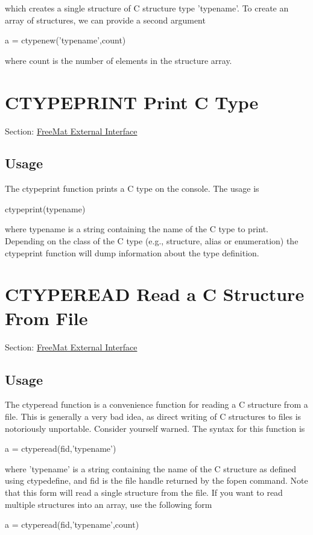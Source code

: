 which creates a single structure of C structure type {\ttfamily 'typename'}. To create an array of structures, we can provide a second argument \begin{DoxyVerb}   a = ctypenew('typename',count)
\end{DoxyVerb}
 where {\ttfamily count} is the number of elements in the structure array. \hypertarget{external_ctypeprint}{}\section{C\-T\-Y\-P\-E\-P\-R\-I\-N\-T Print C Type}\label{external_ctypeprint}
Section\-: \hyperlink{sec_external}{Free\-Mat External Interface} \hypertarget{vtkwidgets_vtkxyplotwidget_Usage}{}\subsection{Usage}\label{vtkwidgets_vtkxyplotwidget_Usage}
The {\ttfamily ctypeprint} function prints a C type on the console. The usage is \begin{DoxyVerb}  ctypeprint(typename)
\end{DoxyVerb}
 where {\ttfamily typename} is a string containing the name of the C type to print. Depending on the class of the C type (e.\-g., structure, alias or enumeration) the {\ttfamily ctypeprint} function will dump information about the type definition. \hypertarget{external_ctyperead}{}\section{C\-T\-Y\-P\-E\-R\-E\-A\-D Read a C Structure From File}\label{external_ctyperead}
Section\-: \hyperlink{sec_external}{Free\-Mat External Interface} \hypertarget{vtkwidgets_vtkxyplotwidget_Usage}{}\subsection{Usage}\label{vtkwidgets_vtkxyplotwidget_Usage}
The {\ttfamily ctyperead} function is a convenience function for reading a C structure from a file. This is generally a very bad idea, as direct writing of C structures to files is notoriously unportable. Consider yourself warned. The syntax for this function is \begin{DoxyVerb}   a = ctyperead(fid,'typename')
\end{DoxyVerb}
 where {\ttfamily 'typename'} is a string containing the name of the C structure as defined using {\ttfamily ctypedefine}, and {\ttfamily fid} is the file handle returned by the {\ttfamily fopen} command. Note that this form will read a single structure from the file. If you want to read multiple structures into an array, use the following form \begin{DoxyVerb}   a = ctyperead(fid,'typename',count)
\end{DoxyVerb}
